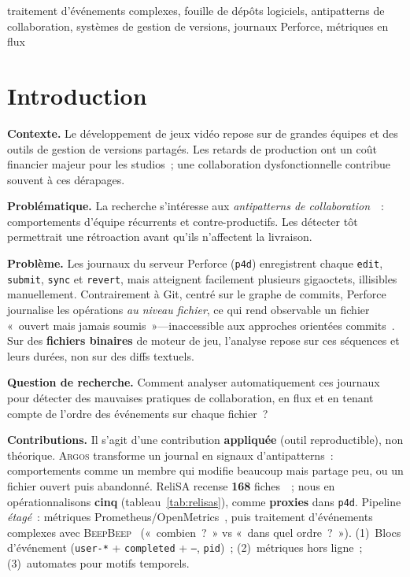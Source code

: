 \documentclass[conference]{IEEEtran}
\newcommand{\toolname}{\textsc{Argos}}
\newcommand{\beepbeep}{\textsc{BeepBeep}}
\begin{document}
\begin{IEEEkeywords}
traitement d'événements complexes, fouille de dépôts logiciels,
antipatterns de collaboration, systèmes de gestion de versions,
journaux Perforce, métriques en flux
\end{IEEEkeywords}

\section{Introduction}

\textbf{Contexte.}
Le développement de jeux vidéo repose sur de grandes équipes et des
outils de gestion de versions partagés. Les retards de production ont un
coût financier majeur pour les studios~; une collaboration
dysfonctionnelle contribue souvent à ces dérapages.

\textbf{Problématique.}
La recherche s'intéresse aux \emph{antipatterns de
collaboration}~\cite{brown1998antipatterns,tamburri2019community,relisa_catalogue}~:
comportements d'équipe récurrents et contre-productifs. Les détecter tôt
permettrait une rétroaction avant qu'ils n'affectent la livraison.

\textbf{Problème.}
Les journaux du serveur Perforce (\texttt{p4d}) enregistrent chaque
\texttt{edit}, \texttt{submit}, \texttt{sync} et \texttt{revert}, mais
atteignent facilement plusieurs gigaoctets, illisibles manuellement.
Contrairement à Git, centré sur le graphe de commits, Perforce journalise
les opérations \emph{au niveau fichier}, ce qui rend observable un
fichier «~ouvert mais jamais soumis~»---inaccessible aux approches
orientées commits~\cite{hindle2008mining}. Sur des \textbf{fichiers
binaires} de moteur de jeu, l'analyse repose sur ces séquences et leurs
durées, non sur des diffs textuels.

\textbf{Question de recherche.}
Comment analyser automatiquement ces journaux pour détecter des
mauvaises pratiques de collaboration, en flux et en tenant compte de
l'ordre des événements sur chaque fichier~?

\textbf{Contributions.}
Il s'agit d'une contribution \textbf{appliquée} (outil reproductible),
non théorique. \toolname{} transforme un journal en signaux
d'antipatterns~: comportements comme un membre qui modifie beaucoup mais
partage peu, ou un fichier ouvert puis abandonné. ReliSA recense
\textbf{168} fiches~\cite{relisa_catalogue}~; nous en opérationnalisons
\textbf{cinq} (tableau~\ref{tab:relisas}), comme \textbf{proxies} dans
\texttt{p4d}. Pipeline \emph{étagé}~: métriques
Prometheus/OpenMetrics~\cite{brazil2018prometheus,openmetrics}, puis
traitement d'événements complexes avec \beepbeep{}~\cite{halle2018beepbeep}
(«~combien~?~» vs «~dans quel ordre~?~»). (1)~Blocs d'événement
(\texttt{user-*} + \texttt{completed} + \texttt{---}, \texttt{pid})~;
(2)~métriques hors ligne~; (3)~automates pour motifs temporels.
\end{document}
